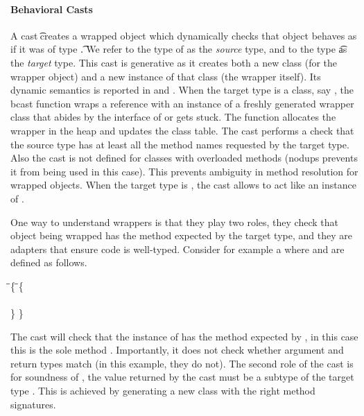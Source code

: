 \documentclass[runnningheads]{tex/llncs}
\begin{document}
\paragraph{Behavioral Casts}\label{p:behcast} A cast \BehCast\t\a creates a
wrapped object \ap which dynamically checks that object \a behaves as if it
was of type \t.  We refer to the type of \a as the \emph{source} type, and to
the type \t as the \emph{target} type. This cast is generative as it creates
both a new class (for the wrapper object) and a new instance of that class
(the wrapper itself). Its dynamic semantics is reported in 
and .  When the target type is a class, say \Cp, the bcast function
wraps a reference \a with an instance of a freshly generated wrapper class \D
that abides by the interface of \Cp or gets stuck. The function allocates the
wrapper in the heap and updates the class table.  The cast performs a check
that the source type has at least all the method names requested by the target
type.  Also the cast is not defined for classes with overloaded methods
(\textsf{nodups} prevents it from being used in this case).  This prevents
ambiguity in method resolution for wrapped objects. When the target type is
\any, the cast allows \a to act like an instance of \any.

One way to understand wrappers is that they play two roles, they check that
object being wrapped has the method expected by the target type, and they
are adapters that ensure \kafka code is well-typed. Consider for example
a \EM{\BehCast\D\New\C{}} where \C and \D are defined as follows.

\begin{tabbing}
\hspace{1cm}\= \class\= \C \{    \hspace{3cm}\=  \class\=  \D \{\\
   \>  \> \Mdef\m\x\any\any\x   \>        \>  \Mdef\m\x\D\D\x\\
   \>  \}  \> \>                         \}
\end{tabbing}

\noindent
The cast will check that the instance of \C has the method expected by \D,
in this case this is the sole method \m.  Importantly, it does not check
whether argument and return types match (in this example, they do not). 
The second role of the cast is for soundness of \kafka, the value 
returned by the cast must be a subtype of the target type \D. This is 
achieved by generating a new class with the right method signatures.
\end{document}
